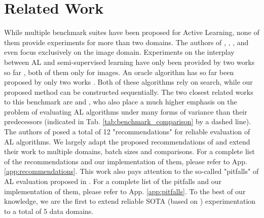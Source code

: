 \documentclass[]{article}
\begin{document}
\section{Related Work}
While multiple benchmark suites have been proposed for Active Learning, none of them provide experiments for more than two domains.
The authors of \cite{beck2021effective}, \cite{munjal2022towards}, \cite{li2022empirical}, \cite{ji2023randomness} and \cite{luth2024navigating} even focus exclusively on the image domain.
Experiments on the interplay between AL and semi-supervised learning have only been provided by two works so far \cite{li2022empirical, luth2024navigating}, both of them only for images.
An oracle algorithm has so far been proposed by only two works \cite{zhou2021towards, zhan2022comparative}. 
Both of these algorithms rely on search, while our proposed method can be constructed sequentially.
The two closest related works to this benchmark are \cite{ji2023randomness} and \cite{luth2024navigating}, who also place a much higher emphasis on the problem of evaluating AL algorithms under many forms of variance than their predecessors (indicated in Tab. \ref{tab:benchmark_comparison} by a dashed line).
The authors of \cite{ji2023randomness} posed a total of 12 "recommendations" for reliable evaluation of AL algorithms.
We largely adapt the proposed recommendations of \cite{ji2023randomness} and extend their work to multiple domains, batch sizes and comparisons.
For a complete list of the recommendations and our implementation of them, please refer to App. \ref{app:recommendations}.
This work also pays attention to the so-called "pitfalls" of AL evaluation proposed in \cite{luth2024navigating}.
For a complete list of the pitfalls and our implementation of them, please refer to App. \ref{app:pitfalls}.
To the best of our knowledge, we are the first to extend reliable SOTA (based on \cite{ji2023randomness, luth2024navigating}) experimentation to a total of 5 data domains.
\end{document}
